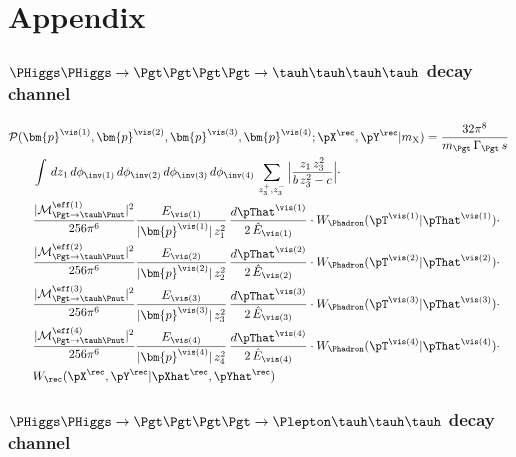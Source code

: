 \section{Appendix}
\label{sec:appendix}

\subsubsection{$\PHiggs\PHiggs \to \Pgt\Pgt\Pgt\Pgt \to \tauh\tauh\tauh\tauh$ decay channel}

\begin{align}
&
\mathcal{P}(\bm{p}^{\vis(1)},\bm{p}^{\vis(2)},\bm{p}^{\vis(3)},\bm{p}^{\vis(4)};\pX^{\rec},\pY^{\rec}|m_{\textrm{X}})
= \frac{32\pi^{8}}{m_{\Pgt} \, \Gamma_{\Pgt} \, s} \, \nonumber \\
& \qquad \int \, dz_{1} \, d\phi_{\inv(1)} \, d\phi_{\inv(2)} \, d\phi_{\inv(3)} \, d\phi_{\inv(4)} \, 
  \sum_{z_{3}^{+},z_{3}^{-}} \, \Bigr\lvert \frac{z_{1} \, z_{3}^{2}}{b \, z_{3}^{2} - c} \Bigr\rvert \cdot \nonumber \\
& \qquad \frac{\vert\mathcal{M}^{\eff(1)}_{\Pgt \to \tauh\Pnut}\vert^{2}}{256\pi^{6}} 
  \frac{E_{\vis(1)}}{\vert\bm{p}^{\vis(1)}\vert \, z_{1}^{2}} \, \frac{d\pThat^{\vis(1)}}{2 \, \hat{E}_{\vis(1)}} 
  \cdot W_{\Phadron}( \pT^{\vis(1)} | \pThat^{\vis(1)} ) \cdot \nonumber \\
& \qquad \frac{\vert\mathcal{M}^{\eff(2)}_{\Pgt \to \tauh\Pnut}\vert^{2}}{256\pi^{6}} 
  \frac{E_{\vis(2)}}{\vert\bm{p}^{\vis(2)}\vert \, z_{2}^{2}} \, \frac{d\pThat^{\vis(2)}}{2 \, \hat{E}_{\vis(2)}} 
  \cdot W_{\Phadron}( \pT^{\vis(2)} | \pThat^{\vis(2)} ) \cdot \nonumber \\
& \qquad \frac{\vert\mathcal{M}^{\eff(3)}_{\Pgt \to \tauh\Pnut}\vert^{2}}{256\pi^{6}} 
  \frac{E_{\vis(3)}}{\vert\bm{p}^{\vis(3)}\vert \, z_{3}^{2}} \, \frac{d\pThat^{\vis(3)}}{2 \, \hat{E}_{\vis(3)}} 
  \cdot W_{\Phadron}( \pT^{\vis(3)} | \pThat^{\vis(3)} ) \cdot \nonumber \\
& \qquad \frac{\vert\mathcal{M}^{\eff(4)}_{\Pgt \to \tauh\Pnut}\vert^{2}}{256\pi^{6}} 
  \frac{E_{\vis(4)}}{\vert\bm{p}^{\vis(4)}\vert \, z_{4}^{2}} \, \frac{d\pThat^{\vis(4)}}{2 \, \hat{E}_{\vis(4)}} 
  \cdot W_{\Phadron}( \pT^{\vis(4)} | \pThat^{\vis(4)} ) \cdot \nonumber \\
& \qquad W_{\rec}( \pX^{\rec},\pY^{\rec} | \pXhat^{\rec},\pYhat^{\rec} ) 
\label{eq:likelihood_thththth}
\end{align}

\subsubsection{$\PHiggs\PHiggs \to \Pgt\Pgt\Pgt\Pgt \to \Plepton\tauh\tauh\tauh$ decay channel}

